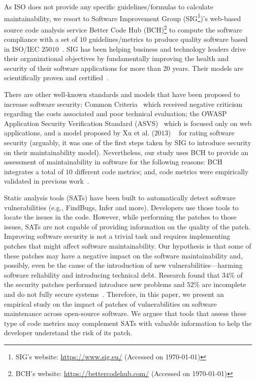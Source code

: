 \documentclass[smallextended]{svjour3}       %
\begin{document}
As ISO does not provide any specific guidelines/formulas to 
calculate maintainability, we resort to Software Improvement Group 
(SIG\footnote{SIG's website: 
\url{https://www.sig.eu/} (Accessed on \today{})})'s web-based source 
code analysis service Better Code Hub (BCH)\footnote{BCH's 
website: \url{https://bettercodehub.com/} (Accessed on \today{})}  
to compute the software compliance with a set of $10$ 
guidelines/metrics to produce quality software based in ISO/IEC 
$25010$~\cite{Visser:2016:OREILLY}. SIG 
has been helping business and technology leaders drive their organizational 
objectives by fundamentally improving the health and security of 
their software applications for more than 20 years. Their 
models are scientifically proven and certified~\cite{4335232,5609747,6113040,baggen2012}.

There are other well-known 
standards and models that have been proposed to increase software 
security: Common Criteria~\cite{common:2009} which received
negative criticism regarding the costs associated and poor technical 
evaluation; the OWASP Application Security Verification 
Standard (ASVS)~\cite{oswap:2009} which is focused only on web 
applications, and a model proposed by Xu et al. ($2013$)
~\cite{6616351} for rating software security (arguably, it was one 
of the first steps taken by SIG to introduce security on their 
maintainability model). Nevertheless, our study uses BCH to provide 
an assessment of maintainability in software for the following 
reasons: BCH integrates a total of $10$ different code metrics; and, 
code metrics were empirically validated in previous 
work~\cite{Bijlsma:2012:FIR:2317098.2317124,8530041,8919169,8785997}.

Static analysis tools (SATs) have been built to automatically detect software 
vulnerabilities (e.g., FindBugs, Infer and more). Developers
use those tools to locate the issues in the code. However,
while performing the patches to those issues, SATs are not 
capable of providing information on the quality of the patch. 
Improving software security is not a trivial task and 
requires implementing patches that might affect software 
maintainability. Our hypothesis is that some of these patches may 
have a negative impact on the software maintainability and, 
possibly, even be the cause of the introduction of new 
vulnerabilities---harming software reliability and introducing 
technical debt. Research found that $34\%$ of the security patches 
performed introduce new problems and $52\%$ are incomplete and do not 
fully secure systems~\cite{10.1145/3133956.3134072}. Therefore, in this paper, 
we present an empirical study on the impact of patches of 
vulnerabilities on software maintenance across open-source software.
We arguee that tools that assess these type of code metrics may
complement SATs with valuable information to help the developer
understand the risk of its patch.
\end{document}
